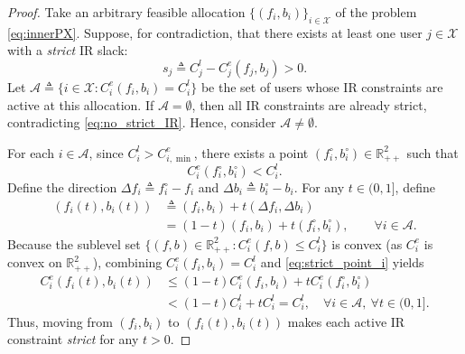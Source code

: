 \documentclass[lettersize,journal]{IEEEtran}
\begin{document}
\begin{proof}
Take an arbitrary feasible allocation $\{(f_i,b_i)\}_{i\in \mathcal{X}}$ of the problem \eqref{eq:innerPX}.
Suppose, for contradiction, that there exists at least one user $j\in \mathcal{X}$ with a \emph{strict} IR slack:
\begin{equation}
\label{eq:pos_slack_j}
s_j \triangleq C_j^l - C_j^e(f_j,b_j) > 0.
\end{equation}
Let $\mathcal{A}\triangleq\{i\in \mathcal{X}: C_i^e(f_i,b_i)=C_i^l\}$ be the set of users whose IR constraints are active at this allocation.
If $\mathcal{A}=\emptyset$, then all IR constraints are already strict, contradicting \eqref{eq:no_strict_IR}. Hence, consider $\mathcal{A}\neq\emptyset$.

For each $i\in \mathcal{A}$, since $C_i^l>C_{i,\min}^e$, there exists a point $(f_i^\circ,b_i^\circ)\in\mathbb{R}_{++}^2$ such that
\begin{equation}
\label{eq:strict_point_i}
C_i^e(f_i^\circ,b_i^\circ) < C_i^l.
\end{equation}
Define the direction $\Delta f_i \triangleq f_i^\circ-f_i$ and $\Delta b_i \triangleq b_i^\circ-b_i$.
For any $t\in(0,1]$, define
\begin{equation}
\begin{aligned}
\label{eq:interp_i}
(f_i(t),b_i(t)) &\triangleq (f_i,b_i)+t(\Delta f_i,\Delta b_i)
\\&= (1-t)(f_i,b_i)+t(f_i^\circ,b_i^\circ),\qquad \forall i\in\mathcal{A}.
\end{aligned}
\end{equation}
Because the sublevel set $\{(f,b)\in\mathbb{R}_{++}^2: C_i^e(f,b)\le C_i^l\}$ is convex (as $C_i^e$ is convex on $\mathbb{R}_{++}^2$), combining $C_i^e(f_i,b_i)=C_i^l$ and \eqref{eq:strict_point_i} yields
\begin{equation}
\begin{aligned}
\label{eq:strict_for_i_t}
C_i^e(f_i(t),b_i(t))
&\le (1-t)C_i^e(f_i,b_i)+t C_i^e(f_i^\circ,b_i^\circ)\\
&< (1-t)C_i^l + t C_i^l
= C_i^l,\quad \forall i\in\mathcal{A},\ \forall t\in(0,1].
\end{aligned}
\end{equation}
Thus, moving from $(f_i,b_i)$ to $(f_i(t),b_i(t))$ makes each active IR constraint \emph{strict} for any $t>0$.


\end{proof}
\end{document}
